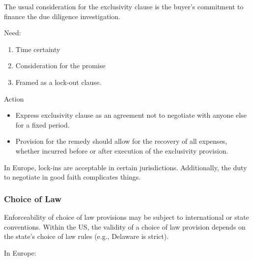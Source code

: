 \documentclass[
]{article}
\providecommand{\tightlist}{%
  \setlength{\itemsep}{0pt}\setlength{\parskip}{0pt}}
\newenvironment{env-b8c4c92e-7b2a-4107-9c08-7c73e5015618}
{
    \savenotes\tcolorbox[blanker,breakable,left=5pt,borderline west={2pt}{-4pt}{aquamarine}]
}
{
    \endtcolorbox\spewnotes
}
\begin{document}
The usual consideration for the exclusivity clause is the buyer's
commitment to finance the due diligence investigation.

Need:

\begin{enumerate}
\tightlist
\item
  Time certainty
\item
  Consideration for the promise
\item
  Framed as a lock-out clause.
\end{enumerate}

\begin{env-b8c4c92e-7b2a-4107-9c08-7c73e5015618}

Action

\begin{itemize}
\tightlist
\item
  Express exclusivity clause as an agreement not to negotiate with
  anyone else for a fixed period.
\item
  Provision for the remedy should allow for the recovery of all
  expenses, whether incurred before or after execution of the
  exclusivity provision.
\end{itemize}

\end{env-b8c4c92e-7b2a-4107-9c08-7c73e5015618}

In Europe, lock-ins are acceptable in certain jurisdictions.
Additionally, the duty to negotiate in good faith complicates things.

\hypertarget{choice-of-law}{%
\subsubsection{Choice of Law}\label{choice-of-law}}

Enforceability of choice of law provisions may be subject to
international or state conventions. Within the US, the validity of a
choice of law provision depends on the state's choice of law rules
(e.g., Delaware is strict).

In Europe:
\end{document}
